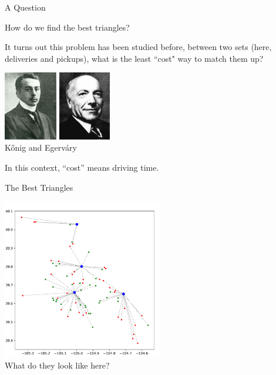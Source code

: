 \documentclass{beamer}
\begin{document}
\begin{frame}{A Question}
	\begin{center}
		How do we find the best triangles?
	\end{center}
	It turns out this problem has been studied before, between two sets (here, deliveries and pickups), what is the least ``cost" way to match them up?
	
	\begin{center}
	\includegraphics[height=3cm]{konig.jpg}\qquad
	\includegraphics[height=3cm]{egervary.jpg}\\
	K\H onig and Egerv\'ary
	\end{center}

	In this context, ``cost'' means driving time.
\end{frame}

\begin{frame}{The Best Triangles}
	\begin{center}
	\includegraphics[width=7cm]{stars.png}\\
	What do they look like here?
	\end{center}
\end{frame}
\end{document}
